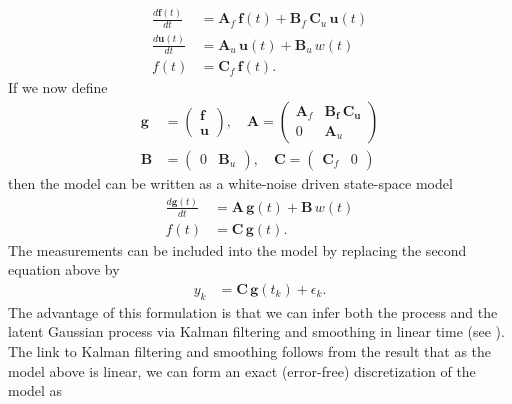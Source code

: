 \documentclass[journal]{IEEEtran}
\begin{document}
%
\begin{equation}
\begin{split}
  \frac{d\mathbf{f}(t)}{dt}
  &= \mathbf{A}_f \, \mathbf{f}(t)
  + \mathbf{B}_f \, \mathbf{C}_u \, \mathbf{u}(t) \\
  \frac{d\mathbf{u}(t)}{dt}
  &= \mathbf{A}_u \, \mathbf{u}(t) + \mathbf{B}_u \, w(t) \\
  f(t) &= \mathbf{C}_f \, \mathbf{f}(t).
\end{split}
\label{eq:comb}
\end{equation}
%
If we now define
%
\begin{equation}
\begin{split}
  \mathbf{g} &= \begin{pmatrix}
	\mathbf{f} \\ \mathbf{u}
  \end{pmatrix}, \quad
  \mathbf{A}
  = \begin{pmatrix}
	\mathbf{A}_f & \mathbf{\mathbf{B}_f \, \mathbf{C}_u} \\
	0 & \mathbf{A}_u
  \end{pmatrix} \\
  \mathbf{B}
  &= \begin{pmatrix}
	0 & \mathbf{B}_u
  \end{pmatrix}, \quad
  \mathbf{C}
  = \begin{pmatrix}
	\mathbf{C}_f & 0
  \end{pmatrix}
\end{split}
\end{equation}
%
then the model can be written as a white-noise driven state-space model
%
\begin{equation}
\begin{split}
  \frac{d\mathbf{g}(t)}{dt}
  &= \mathbf{A} \, \mathbf{g}(t)
  + \mathbf{B} \, w(t) \\
  f(t) &= \mathbf{C} \, \mathbf{g}(t).
\end{split}
\label{eq:ssaug}
\end{equation}
%
The measurements can be included into the model by replacing the second equation above by
%
\begin{equation}
\begin{split}
  y_k &= \mathbf{C} \, \mathbf{g}(t_k) + \epsilon_k.
\end{split}
\label{eq:ssaugkf}
\end{equation}
%
The advantage of this formulation is that we can infer both the process and the latent Gaussian process via Kalman filtering and smoothing in linear time (see \cite{Hartikainen+Sarkka:2010,Sarkka+Solin+Hartikainen:2013}). The link to Kalman filtering and smoothing follows from the result that as the model above is linear, we can form an exact (error-free) discretization of the model as
\end{document}
